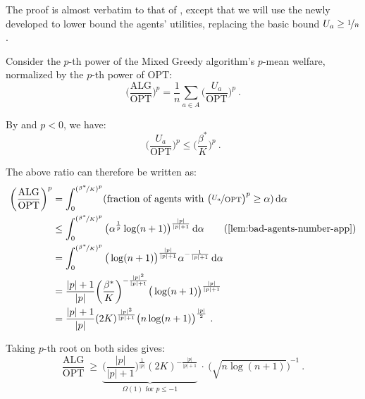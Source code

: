 \documentclass[11pt,letterpaper]{article}
\newcommand{\OPT}{\mathrm{OPT}}
\newcommand{\ALG}{\mathrm{ALG}}
\newcommand{\dif}[1]{\,\text{\rm d} #1}
\newcommand{\utility}{U}
\begin{document}
The proof is almost verbatim to that of , except that we will use the newly developed  to lower bound the agents' utilities, replacing the basic bound $\utility_a \ge \nicefrac{1}{n}$.

Consider the $p$-th power of the Mixed Greedy algorithm's $p$-mean welfare, normalized by the $p$-th power of $\OPT$:
\[
\bigg( \frac{\ALG}{\OPT} \bigg)^p = \frac{1}{n} \sum_{a\in A} \bigg( \frac{\utility_a}{\OPT} \bigg)^p
~.
\]

By  and $p < 0$, we have:
\[
\bigg(\frac{\utility_a}{\OPT}\bigg)^p \le \bigg(\frac{\beta^*}{K}\bigg)^p
~.
\]

The above ratio can therefore be written as:
\begin{align*}
	\bigg( \frac{\ALG}{\OPT} \bigg)^p
	& = \int_0^{(\nicefrac{\beta^*}{K})^p} (\text{fraction of agents with $\big( \nicefrac{\utility_a}{\OPT} \big)^p \ge \alpha$)} \dif{\alpha} \\
	&
	\le \int_0^{(\nicefrac{\beta^*}{K})^p} \big( \alpha^{\frac{1}{p}} \log(n+1) \big)^{\frac{|p|}{|p|+1}} \dif{\alpha} 
	\tag{\Cref{lem:bad-agents-number-app}} \\
	&
	= \int_0^{(\nicefrac{\beta^*}{K})^p} \big( \log(n+1) \big)^{\frac{|p|}{|p|+1}} \alpha^{-\frac{1}{|p|+1}} \dif{\alpha} \\
	&
	= \frac{|p|+1}{|p|} \bigg(\frac{\beta^*}{K}\bigg)^{-\frac{|p|^2}{|p|+1}} \big(\log(n+1) \big)^{\frac{|p|}{|p|+1}} \\
	&
	= \frac{|p|+1}{|p|} (2K)^{{\frac{|p|^2}{|p|+1}}} \big( n \log(n+1) \big)^{\frac{|p|}{2}}
	~.
\end{align*}

Taking $p$-th root on both sides gives:
\[
\frac{\ALG}{\OPT} ~\ge~ \underbrace{\bigg( \frac{|p|}{|p|+1} \bigg)^{\frac{1}{|p|}} (2K)^{-{\frac{|p|}{|p|+1}}}}_{\text{$\Omega(1)$ for $p \le -1$}} ~\cdot~ {\Big(\sqrt{n \log(n+1)}\Big)}^{-1}
~.
\]








 
\end{document}
